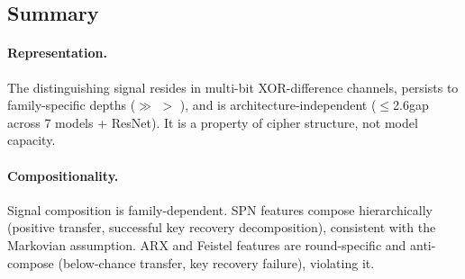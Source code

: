 \subsection{Summary}
\label{sec:exp-summary}

\paragraph{Representation.}
The distinguishing signal resides in multi-bit XOR-difference channels, persists to family-specific depths (\simon $\gg$ \speck $>$ \present), and is architecture-independent ($\leq$2.6\pp gap across 7 models + ResNet).
It is a property of cipher structure, not model capacity.

\paragraph{Compositionality.}
Signal composition is family-dependent.
SPN features compose hierarchically (positive transfer, successful key recovery decomposition), consistent with the Markovian assumption.
ARX and Feistel features are round-specific and anti-compose (below-chance transfer, key recovery failure), violating it.
